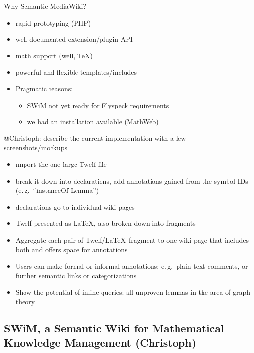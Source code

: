 \documentclass{llncs}
\begin{document}
Why Semantic MediaWiki\cite{KrSchVr:semwiki-reasoning07}?
\begin{itemize}
\item rapid prototyping (PHP)
\item well-documented extension/plugin API
\item math support (well, \TeX)
\item powerful and flexible templates/includes
\item Pragmatic reasons:
  \begin{itemize}
  \item SWiM not yet ready for Flyspeck requirements
  \item we had an installation available (MathWeb)
  \end{itemize}
\end{itemize}

\begin{todo}{@Christoph: describe the current implementation with a few
    screenshots/mockups}
  \begin{itemize}
  \item import the one large Twelf file
  \item break it down into declarations, add annotations gained from the symbol IDs
    (e.\,g.\ ``instanceOf Lemma'')
  \item declarations go to individual wiki pages
  \item Twelf presented as \LaTeX, also broken down into fragments
  \item Aggregate each pair of Twelf/\LaTeX\ fragment to one wiki page that includes both
    and offers space for annotations
  \item Users can make formal or informal annotations: e.\,g.\ plain-text comments, or
    further semantic links or categorizations
  \item Show the potential of inline queries: all unproven lemmas in the area of graph
    theory
  \end{itemize}
\end{todo}

\subsection{SWiM, a Semantic Wiki for Mathematical Knowledge Management (Christoph)}
\label{sec:swim}
\end{document}

